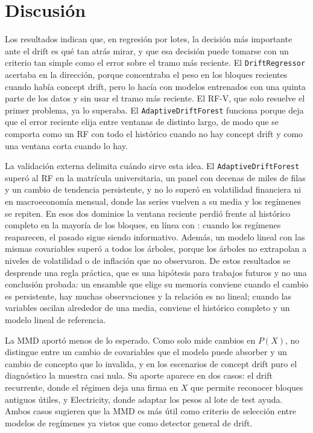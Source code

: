 \documentclass[11pt,a4paper]{article}
\begin{document}
\section{Discusión}\label{sec:discusion}

Los resultados indican que, en regresión por lotes, la decisión más importante ante el drift es qué
tan atrás mirar, y que esa decisión puede tomarse con un criterio tan simple como el error sobre el
tramo más reciente. El \texttt{DriftRegressor} acertaba en la dirección, porque concentraba el peso
en los bloques recientes cuando había concept drift, pero lo hacía con modelos entrenados con una
quinta parte de los datos y sin usar el tramo más reciente. El RF-V, que solo resuelve el primer
problema, ya lo superaba. El \texttt{AdaptiveDriftForest} funciona porque deja que el error reciente
elija entre ventanas de distinto largo, de modo que se comporta como un RF con todo el histórico
cuando no hay concept drift y como una ventana corta cuando lo hay.

La validación externa delimita cuándo sirve esta idea. El \texttt{AdaptiveDriftForest} superó al RF
en la matrícula universitaria, un panel con decenas de miles de filas y un cambio de tendencia
persistente, y no lo superó en volatilidad financiera ni en macroeconomía mensual, donde las series
vuelven a su media y los regímenes se repiten. En esos dos dominios la ventana reciente perdió frente al
histórico completo en la mayoría de los bloques, en línea con \textcite{pesaran2007}: cuando los regímenes
reaparecen, el pasado sigue siendo informativo. Además, un modelo lineal con las mismas covariables
superó a todos los árboles, porque los árboles no extrapolan a niveles de volatilidad o de inflación que no
observaron. De estos resultados se desprende una regla práctica, que es una hipótesis para trabajos
futuros y no una conclusión probada: un ensamble que elige su memoria conviene cuando el cambio es
persistente, hay muchas observaciones y la relación es no lineal; cuando las variables oscilan alrededor
de una media, conviene el histórico completo y un modelo lineal de referencia.

La MMD aportó menos de lo esperado. Como solo mide cambios en $P(X)$, no distingue entre un cambio de
covariables que el modelo puede absorber y un cambio de concepto que lo invalida, y en los escenarios
de concept drift puro el diagnóstico la muestra casi nula. Su aporte aparece en dos casos: el drift
recurrente, donde el régimen deja una firma en $X$ que permite reconocer bloques antiguos útiles, y
Electricity, donde adaptar los pesos al lote de test ayuda. Ambos casos sugieren que la MMD es más
útil como criterio de selección entre modelos de regímenes ya vistos que como detector general de
drift.
\end{document}
